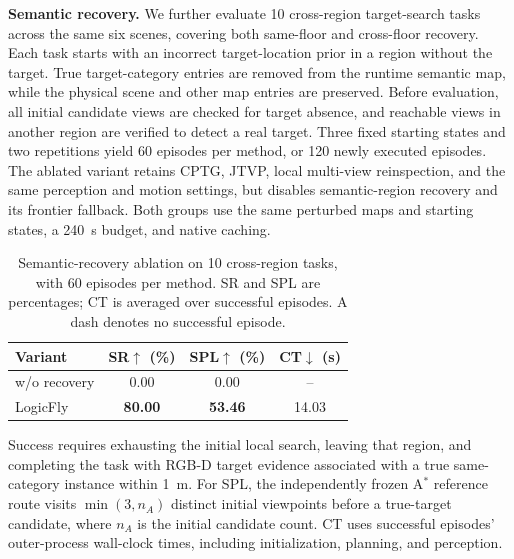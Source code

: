 \documentclass[letterpaper,10pt,journal]{IEEEtran}
\begin{document}
\textbf{Semantic recovery.}
We further evaluate 10 cross-region target-search tasks across the same six scenes, covering both same-floor and cross-floor recovery. Each task starts with an incorrect target-location prior in a region without the target. True target-category entries are removed from the runtime semantic map, while the physical scene and other map entries are preserved. Before evaluation, all initial candidate views are checked for target absence, and reachable views in another region are verified to detect a real target. Three fixed starting states and two repetitions yield 60 episodes per method, or 120 newly executed episodes. The ablated variant retains CPTG, JTVP, local multi-view reinspection, and the same perception and motion settings, but disables semantic-region recovery and its frontier fallback. Both groups use the same perturbed maps and starting states, a 240~s budget, and native caching.

\begin{table}[!hb]
\caption{Semantic-recovery ablation on 10 cross-region tasks, with 60 episodes per method. SR and SPL are percentages; CT is averaged over successful episodes. A dash denotes no successful episode.}
\label{tab:recovery-ablation}\centering\small\renewcommand{\arraystretch}{1.15}
\begin{tabular*}{\columnwidth}{@{\extracolsep{\fill}}lccc@{}}\toprule
Variant&SR$\uparrow$ (\%)&SPL$\uparrow$ (\%)&CT$\downarrow$ (s)\\\midrule
w/o recovery&0.00&0.00&--\\
LogicFly&\textbf{80.00}&\textbf{53.46}&14.03\\\bottomrule
\end{tabular*}
\end{table}

Success requires exhausting the initial local search, leaving that region, and completing the task with RGB-D target evidence associated with a true same-category instance within 1~m. For SPL, the independently frozen A$^*$ reference route visits $\min(3,n_A)$ distinct initial viewpoints before a true-target candidate, where $n_A$ is the initial candidate count. CT uses successful episodes' outer-process wall-clock times, including initialization, planning, and perception.
\end{document}
